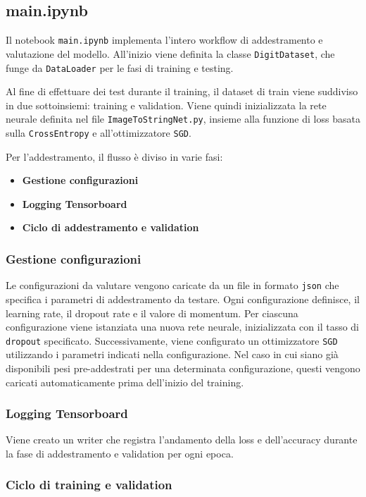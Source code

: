 \subsection*{main.ipynb}
Il notebook \texttt{main.ipynb} implementa l'intero workflow di addestramento e valutazione del modello.
All'inizio viene definita la classe \texttt{DigitDataset}, che funge da \texttt{DataLoader} per le fasi di training e testing.

Al fine di effettuare dei test durante il training, il dataset di train viene suddiviso in due sottoinsiemi: training e validation.
Viene quindi inizializzata la rete neurale definita nel file \texttt{ImageToStringNet.py}, insieme alla funzione di loss basata sulla \texttt{CrossEntropy} e all'ottimizzatore \texttt{SGD}.

Per l'addestramento, il flusso è diviso in varie fasi:
\begin{itemize}
    \item \textbf{Gestione configurazioni}
    \item \textbf{Logging Tensorboard}
    \item \textbf{Ciclo di addestramento e validation}
 \end{itemize}

\subsubsection*{Gestione configurazioni}
Le configurazioni da valutare vengono caricate da un file in formato \texttt{json} che specifica i parametri di addestramento da testare.  
Ogni configurazione definisce, il learning rate, il dropout rate e il valore di momentum. Per ciascuna configurazione viene istanziata una nuova rete neurale, inizializzata con il tasso di \texttt{dropout} specificato.
Successivamente, viene configurato un ottimizzatore \texttt{SGD} utilizzando i parametri indicati nella configurazione.
Nel caso in cui siano già disponibili pesi pre-addestrati per una determinata configurazione, questi vengono caricati automaticamente prima dell'inizio del training.

\subsubsection*{Logging Tensorboard}
Viene creato un writer che registra l'andamento della loss e dell'accuracy durante la fase di addestramento e validation per ogni epoca.

\subsubsection*{Ciclo di training e validation}

